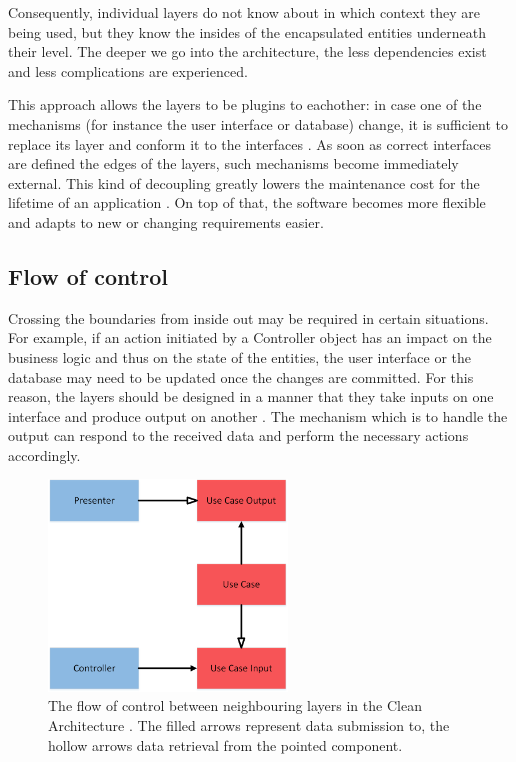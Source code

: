 \documentclass[conference]{IEEEtran}
\begin{document}
Consequently, individual layers do not know about in which context they are being used, but they know the insides of the encapsulated entities underneath their level. The deeper we go into the architecture, the less dependencies exist and less complications are experienced. 

This approach allows the layers to be plugins to eachother: in case one of the mechanisms (for instance the user interface or database) change, it is sufficient to replace its layer and conform it to the interfaces \cite{cleanarchitecture} \cite{onionarchitecture}. As soon as correct interfaces are defined the edges of the layers, such mechanisms become immediately external. This kind of decoupling greatly lowers the maintenance cost for the lifetime of an application \cite{onionarchitecture}. On top of that, the software becomes more flexible and adapts to new or changing requirements easier. 

\subsection{Flow of control}
Crossing the boundaries from inside out may be required in certain situations. For example, if an action initiated by a Controller object has an impact on the business logic and thus on the state of the entities, the user interface or the database may need to be updated once the changes are committed. For this reason, the layers should be designed in a manner that they take inputs on one interface and produce output on another \cite{cleanarchitecture}. The mechanism which is to handle the output can respond to the received data and perform the necessary actions accordingly. 

\begin{figure}[!t]
\centering
\includegraphics[width=2.5in]{images/flowcontrol.png}
\caption{The flow of control between neighbouring layers in the Clean Architecture \cite{cleanarchitecture}. The filled arrows represent data submission to, the hollow arrows data retrieval from the pointed component.}
\label{flowcontrol}
\end{figure}
\end{document}
